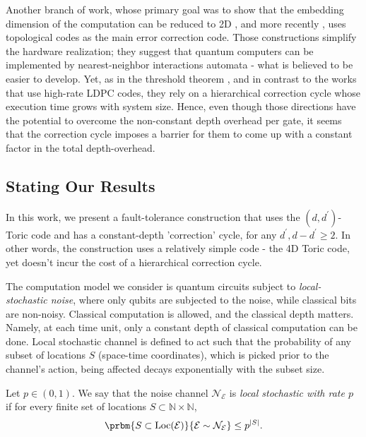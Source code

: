 Another branch of work, whose primary goal was to show that the embedding dimension of the computation can be reduced to 2D \cite{Balasubramanian_2026}, and more recently \cite{dünnweber2026quantummemoryautonomouscomputation}, uses topological codes as the main error correction code. Those constructions simplify the hardware realization; they suggest that quantum computers can be implemented by nearest-neighbor interactions automata - what is believed to be easier to develop. Yet, as in the threshold theorem \cite{aharonov1999faulttolerant}, and in contrast to the works that use high-rate LDPC codes, they rely on a hierarchical correction cycle whose execution time grows with system size. Hence, even though those directions have the potential to overcome the non-constant depth overhead per gate, it seems that the correction cycle imposes a barrier for them to come up with a constant factor in the total depth-overhead. 

\subsection{Stating Our Results}
In this work, we present a fault-tolerance construction that uses the $(d,d^{\prime})$-Toric code and has a constant-depth 'correction' cycle, for any $d^{\prime},d-d^{\prime} \ge 2$. In other words, the construction uses a relatively simple code - the 4D Toric code, yet doesn't incur the cost of a hierarchical correction cycle.

The computation model we consider is quantum circuits subject to \textit{local-stochastic noise}, where only qubits are subjected to the noise, while classical bits are non-noisy. Classical computation is allowed, and the classical depth matters. Namely, at each time unit, only a constant depth of classical computation can be done.  Local stochastic channel is defined to act such that the probability of any subset of locations $S$ (space-time coordinates), which is picked prior to the channel's action, being affected decays exponentially with the subset size. 
\begin{definition}
  Let $p\in(0,1)$. We say that the noise channel $\mathcal{N}_{\mathcal{E}}$ is \textit{local stochastic with rate $p$} if for every finite set of locations $S\subset \mathbb{N}\times \mathbb{N}$,
  \begin{equation*}
    \begin{split}
      \prbm{S\subset \operatorname{Loc}(\mathcal{E})}{\mathcal{E}\sim \mathcal{N}_{\mathcal{E}}}
      \le p^{|S|}.
    \end{split}
  \end{equation*}
\end{definition}

